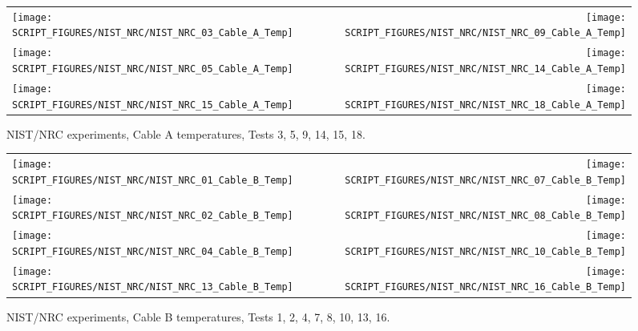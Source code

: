 \begin{figure}[p]
\begin{tabular*}{\textwidth}{l@{\extracolsep{\fill}}r}
\texttt{[image: SCRIPT\_FIGURES/NIST\_NRC/NIST\_NRC\_03\_Cable\_A\_Temp]} &
\texttt{[image: SCRIPT\_FIGURES/NIST\_NRC/NIST\_NRC\_09\_Cable\_A\_Temp]} \\
\texttt{[image: SCRIPT\_FIGURES/NIST\_NRC/NIST\_NRC\_05\_Cable\_A\_Temp]} &
\texttt{[image: SCRIPT\_FIGURES/NIST\_NRC/NIST\_NRC\_14\_Cable\_A\_Temp]} \\
\texttt{[image: SCRIPT\_FIGURES/NIST\_NRC/NIST\_NRC\_15\_Cable\_A\_Temp]} &
\texttt{[image: SCRIPT\_FIGURES/NIST\_NRC/NIST\_NRC\_18\_Cable\_A\_Temp]}
\end{tabular*}
\caption[NIST/NRC experiments, Cable A temperatures, Tests 3, 5, 9, 14, 15, 18]{NIST/NRC experiments, Cable A temperatures, Tests 3, 5, 9, 14, 15, 18.}
\label{NIST_NRC_Cable_A_Open}
\end{figure}

\begin{figure}[p]
\begin{tabular*}{\textwidth}{l@{\extracolsep{\fill}}r}
\texttt{[image: SCRIPT\_FIGURES/NIST\_NRC/NIST\_NRC\_01\_Cable\_B\_Temp]} &
\texttt{[image: SCRIPT\_FIGURES/NIST\_NRC/NIST\_NRC\_07\_Cable\_B\_Temp]} \\
\texttt{[image: SCRIPT\_FIGURES/NIST\_NRC/NIST\_NRC\_02\_Cable\_B\_Temp]} &
\texttt{[image: SCRIPT\_FIGURES/NIST\_NRC/NIST\_NRC\_08\_Cable\_B\_Temp]} \\
\texttt{[image: SCRIPT\_FIGURES/NIST\_NRC/NIST\_NRC\_04\_Cable\_B\_Temp]} &
\texttt{[image: SCRIPT\_FIGURES/NIST\_NRC/NIST\_NRC\_10\_Cable\_B\_Temp]} \\
\texttt{[image: SCRIPT\_FIGURES/NIST\_NRC/NIST\_NRC\_13\_Cable\_B\_Temp]} &
\texttt{[image: SCRIPT\_FIGURES/NIST\_NRC/NIST\_NRC\_16\_Cable\_B\_Temp]}
\end{tabular*}
\caption[NIST/NRC experiments, Cable B temperatures, Tests 1, 2, 4, 7, 8, 10, 13, 16]{NIST/NRC experiments, Cable B temperatures, Tests 1, 2, 4, 7, 8, 10, 13, 16.}
\label{NIST_NRC_Cable_B_Closed}
\end{figure}

